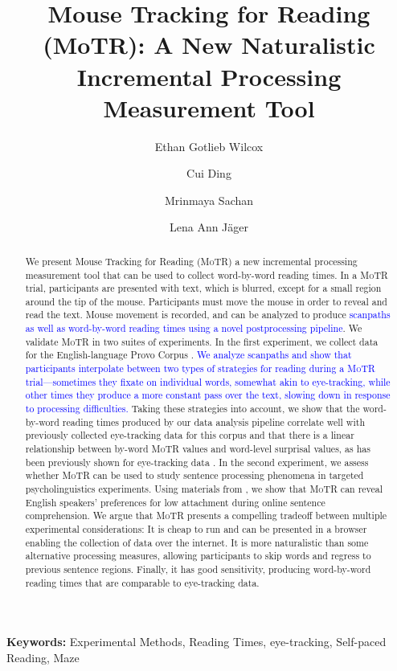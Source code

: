 \documentclass[12pt]{article}
\title{Mouse Tracking for Reading (MoTR): A New Naturalistic Incremental Processing Measurement Tool}
\author[a]{Ethan Gotlieb Wilcox}
\author[b]{Cui Ding}
\author[a]{Mrinmaya Sachan}
\author[b,c]{Lena Ann J\"ager}
\affil[a]{\vspace{-0.2cm}\small\textit{ETH Z\"urich, Department of Computer Science}}
\affil[b]{\vspace{-0.2cm}\small\textit{University of Z\"urich, Department of Computational Linguistics}}
\affil[c]{\small\textit{University of Potsdam, Department of Computer Science}}
\date{}
\newcommand{\motr}{\textsc{MoTR}\xspace}
\newcommand{\change}[1]{\textcolor{blue}{#1}}
\begin{document}
\maketitle


\begin{abstract}

We present Mouse Tracking for Reading (\motr) a new incremental processing measurement tool that can be used to collect word-by-word reading times. In a \motr trial, participants are presented with text, which is blurred, except for a small region around the tip of the mouse. Participants must move the mouse in order to reveal and read the text. Mouse movement is recorded, and can be analyzed to produce \change{scanpaths as well as word-by-word reading times using a novel postprocessing pipeline}. We validate \motr in two suites of experiments. In the first experiment, we collect data for the English-language Provo Corpus \citep{luke2016content}. \change{We analyze scanpaths and show that participants interpolate between two types of strategies for reading during a \motr trial---sometimes they fixate on individual words, somewhat akin to eye-tracking, while other times they produce a more constant pass over the text, slowing down in response to processing difficulties.} Taking these strategies into account, we show that the word-by-word reading times produced by our data analysis pipeline correlate well with previously collected eye-tracking data for this corpus and that there is a linear relationship between by-word \motr values and word-level surprisal values, as has been previously shown for eye-tracking data \citep{smith2013effect}. In the second experiment, we assess whether \motr can be used to study sentence processing phenomena in targeted psycholinguistics experiments. Using materials from \cite{witzel2012maze}, we show that \motr can reveal English speakers' preferences for low attachment during online sentence comprehension. We argue that \motr presents a compelling tradeoff between multiple experimental considerations: It is cheap to run and can be presented in a browser enabling the collection of data over the internet. It is more naturalistic than some alternative processing measures, allowing participants to skip words and regress to previous sentence regions. Finally, it has good sensitivity, producing word-by-word reading times that are comparable to eye-tracking data.

\end{abstract}

\textbf{Keywords:} Experimental Methods, Reading Times, eye-tracking, Self-paced Reading, Maze
\end{document}
